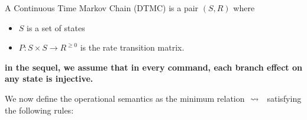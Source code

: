 \begin{definition}
  A Continuous Time Markov Chain (DTMC) is a pair $(S,R)$ where
  \begin{itemize}
  \item $S$ is a set of states
  \item $P: S\times S \rightarrow  R^{\geq 0}$ is the rate
    transition matrix.
  \end{itemize}
\end{definition}

\newpage

{\bf in the sequel, we assume that in every command, each branch
  effect on any state is injective.}


We now define the operational semantics as the minimum relation
$\ \stackrel{}{\rightsquigarrow}\ {}$ satisfying the following rules:
% 
